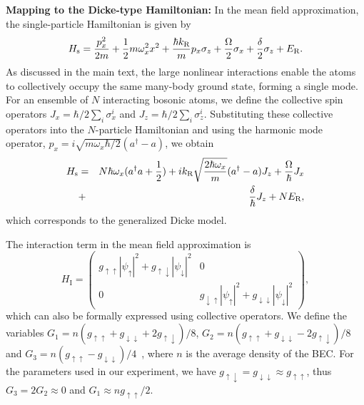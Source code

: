 \documentclass[prl,aps,twocolumn,floatfix]{revtex4}
\begin{document}
\textbf{Mapping to the Dicke-type Hamiltonian:} In the mean field
approximation, the single-particle Hamiltonian is given by
\begin{equation}
H_{\text{s}}=\frac{p_{x}^{2}}{2m}+\frac{1}{2}m\omega _{x}^{2}x^{2}+\frac{%
\hbar k_{\text{R}}}{m}p_{x}\sigma _{z}+\frac{\Omega }{2}\sigma _{x}+\frac{%
\delta }{2}\sigma _{z}+E_{\text{R}}.
\end{equation}%
As discussed in the main text, the large nonlinear interactions enable the
atoms to collectively occupy the same many-body ground state, forming a
single mode. For an ensemble of $N$ interacting bosonic atoms, we define the
collective spin operators $J_{x}=\hbar/2 \sum_{i}\sigma _{x}^{i}$ and $%
J_{z}=\hbar/2 \sum_{i}\sigma _{z}^{i}$. Substituting these collective
operators into the $N$-particle Hamiltonian and using the harmonic mode
operator, $p_{x}=i\sqrt{m\omega_{x}{\hbar }/2}(a^{\dagger }-a)$, we obtain
\begin{eqnarray}
H_{\text{s}}&=&N\hbar \omega _{x}(a^{\dagger }{a}+\frac{1}{2})+ik_{\text{R}}%
\sqrt{\frac{2\hbar \omega _{x}}{m}}(a^{\dagger }-a)J_{z}+\frac{\Omega }{%
\hbar }J_{x}  \notag \\
&+& \frac{\delta }{\hbar }J_{z}+NE_{\text{R}}{,}
\end{eqnarray}%
which corresponds to the generalized Dicke model.

The interaction term in the mean field approximation is
\begin{equation*}
H_{\text{I}}=%
\begin{pmatrix}
g_{\uparrow \uparrow }|\psi _{\uparrow }|^{2}+g_{\uparrow \downarrow }|\psi
_{\downarrow }|^{2} & 0 \\
0 & g_{\downarrow \uparrow }|\psi _{\uparrow }|^{2}+g_{\downarrow \downarrow
}|\psi _{\downarrow }|^{2}%
\end{pmatrix}%
,
\end{equation*}%
which can also be formally expressed using collective operators. We define
the variables $G_{1}=n(g_{\uparrow \uparrow }+g_{\downarrow \downarrow
}+2g_{\uparrow \downarrow })/8$, $G_{2}=n(g_{\uparrow \uparrow
}+g_{\downarrow \downarrow }-2g_{\uparrow \downarrow })/8$ and $%
G_{3}=n(g_{\uparrow \uparrow }-g_{\downarrow \downarrow })/4$~\cite%
{Stringari}, where $n$ is the average density of the BEC. For the parameters
used in our experiment, we have $g_{\uparrow \downarrow }=g_{\downarrow
\downarrow }\approx g_{\uparrow \uparrow }$, thus $G_{3}=2G_{2}\approx 0$
and $G_{1}\approx n{g_{\uparrow \uparrow }}/2$.
\end{document}
